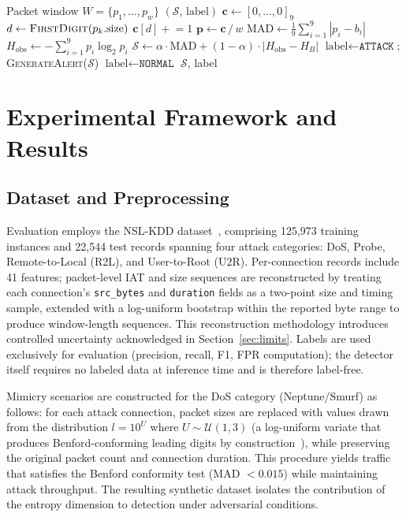 \documentclass[conference]{IEEEtran}
\begin{document}
\begin{algorithm}[t]
\caption{Benford-Entropic NIDS Detection}
\label{alg:nids}
\small
\begin{algorithmic}[1]
\REQUIRE Packet window $W = \{p_1,\ldots,p_w\}$
\ENSURE $(\mathcal{S},\, \text{label})$
\STATE $\mathbf{c} \leftarrow [0,\ldots,0]_9$ 
  \STATE $d \leftarrow \textsc{FirstDigit}(p_k.\text{size})$
  \STATE $\mathbf{c}[d] \mathrel{+}= 1$
\ENDFOR
\STATE $\mathbf{p} \leftarrow \mathbf{c}\,/\,w$
\STATE $\text{MAD} \leftarrow \frac{1}{9}\sum_{i=1}^9|p_i - b_i|$
\STATE $H_{\mathrm{obs}} \leftarrow -\sum_{i=1}^9 p_i \log_2 p_i$
\STATE $\mathcal{S} \leftarrow \alpha\cdot\text{MAD} +
        (1-\alpha)\cdot|H_{\mathrm{obs}} - H_B|$
  \STATE $\text{label} \leftarrow \texttt{ATTACK}$;
         \textsc{GenerateAlert}($\mathcal{S}$)
\ELSE
  \STATE $\text{label} \leftarrow \texttt{NORMAL}$
\ENDIF
\RETURN $\mathcal{S}$, label
\end{algorithmic}
\end{algorithm}

\section{Experimental Framework and Results}

\subsection{Dataset and Preprocessing}

Evaluation employs the NSL-KDD dataset~\cite{b9}, comprising 125,973 training
instances and 22,544 test records spanning four attack categories: DoS,
Probe, Remote-to-Local (R2L), and User-to-Root (U2R). Per-connection records
include 41 features; packet-level IAT and size sequences are reconstructed
by treating each connection's \texttt{src\_bytes} and \texttt{duration}
fields as a two-point size and timing sample, extended with a log-uniform
bootstrap within the reported byte range to produce window-length sequences.
This reconstruction methodology introduces controlled uncertainty acknowledged
in Section~\ref{sec:limits}. Labels are used exclusively for evaluation
(precision, recall, F1, FPR computation); the detector itself requires no
labeled data at inference time and is therefore label-free.

Mimicry scenarios are constructed for the DoS category (Neptune/Smurf) as
follows: for each attack connection, packet sizes are replaced with values
drawn from the distribution $l = 10^U$ where $U \sim \mathcal{U}(1, 3)$ (a
log-uniform variate that produces Benford-conforming leading digits by
construction~\cite{b5}), while preserving the original packet count and
connection duration. This procedure yields traffic that satisfies the
Benford conformity test (MAD $< 0.015$) while maintaining attack throughput.
The resulting synthetic dataset isolates the contribution of the entropy
dimension to detection under adversarial conditions.
\end{document}
